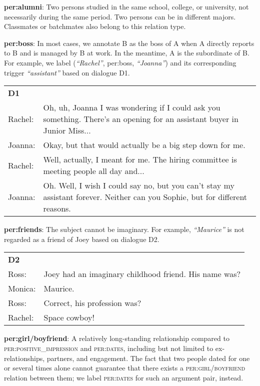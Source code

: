 \documentclass[11pt,a4paper]{article}
\begin{document}
\noindent  \textbf{per:alumni}: Two persons studied in the same school, college, or university, not necessarily during the same period. Two persons can be in different majors. Classmates or batchmates also belong to this relation type.  


\noindent  \textbf{per:boss}: In most cases, we annotate B as the boss of A when A directly reports to B and is managed by B at work. In the meantime, A is the subordinate of B.
For example, we label (\emph{``Rachel''}, per:boss, \emph{``Joanna''}) and its corresponding trigger \emph{``assistant''} based on dialogue D1.   

\begin{table}[h!]
\centering
\footnotesize
\begin{tabular}{p{1cm}p{5.8cm}}
\toprule
\textbf{D1} &\\
Rachel: & Oh, uh, Joanna I was wondering if I could ask you something. There's an opening for an assistant buyer in Junior Miss...\\
Joanna: &  Okay, but that would actually be a big step down for me.  \\
Rachel: & Well, actually, I meant for me. The hiring committee is meeting people all day and... \\
Joanna: & Oh. Well, I wish I could say no, but you can’t stay my assistant forever. Neither can you Sophie, but for different reasons. \\
\bottomrule
\end{tabular}
\end{table}



\noindent  \textbf{per:friends}: The subject cannot be imaginary. For example, \emph{``Maurice''} is not regarded as a friend of Joey based on dialogue D2.


\begin{table}[h!]
\centering
\footnotesize
\begin{tabular}{p{1cm}p{5.8cm}}
\toprule
\textbf{D2} &\\
Ross: & Joey had an imaginary childhood friend. His name was? \\
Monica: & Maurice.   \\
Ross: &  Correct, his profession was? \\
Rachel: &  Space cowboy! \\
\bottomrule
\end{tabular}
\end{table}


\noindent  \textbf{per:girl/boyfriend}:  A relatively long-standing relationship compared to \textsc{per:positive\_impression} and \textsc{per:dates}, including but not limited to ex-relationships, partners, and engagement. The fact that two people dated for one or several times alone cannot guarantee that there exists a \textsc{per:girl/boyfriend} relation between them; we label \textsc{per:dates} for such an argument pair, instead.
\end{document}
